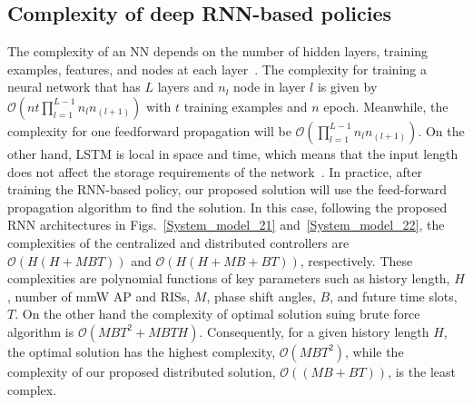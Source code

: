 \documentclass[conference]{IEEEtran}
\begin{document}
\subsection{Complexity of deep RNN-based policies}
The complexity of an NN depends on the number of hidden layers, training examples, features, and nodes at each layer~\cite{complexity}. The complexity for training a neural network that has $L$ layers and $n_l$ node in layer $l$ is given by $\mathcal{O}(nt\prod_{l=1}^{L-1} n_ln_{(l+1)})$ with $t$ training examples and $n$ epoch. Meanwhile, the complexity for one feedforward propagation will be $\mathcal{O}(\prod_{l=1}^{L-1} n_ln_{(l+1)})$. On the other hand, LSTM is local in space and time, which means that the input length does not affect the storage requirements of the network~\cite{complexity3}. In practice, after training the RNN-based policy, our proposed solution will use the feed-forward propagation algorithm to find the solution. In this case, following the proposed RNN architectures in Figs.~\ref{System_model_21} and~\ref{System_model_22}, the complexities of the centralized and distributed controllers are $\mathcal{O}(H(H+MBT))$ and $\mathcal{O}(H(H+MB+BT))$, respectively. These complexities are polynomial functions of key parameters such as history length, $H$, number of mmW AP and RISs, $M$, phase shift angles, $B$, and future time slots, $T$. On the other hand the complexity of optimal solution suing brute force algorithm is $\mathcal{O}(MBT^2+MBTH)$. Consequently, for a given history length $H$, the optimal solution has the highest complexity, $\mathcal{O}(MBT^2)$, while the complexity of our proposed distributed solution, $\mathcal{O}((MB+BT))$, is the least complex.
\end{document}

